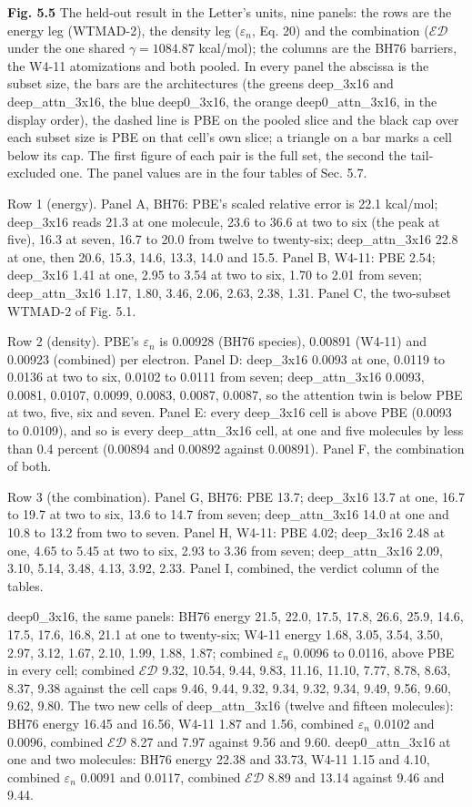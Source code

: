 \documentclass[10pt,a4paper]{article}
\begin{document}
\textbf{Fig. 5.5} The held-out result in the Letter's units, nine panels: the rows are the energy leg (WTMAD-2), the density leg ($\varepsilon_n$, Eq. 20) and the combination ($\mathcal{ED}$ under the one shared $\gamma = 1084.87$ kcal/mol); the columns are the BH76 barriers, the W4-11 atomizations and both pooled. In every panel the abscissa is the subset size, the bars are the architectures (the greens deep\_3x16 and deep\_attn\_3x16, the blue deep0\_3x16, the orange deep0\_attn\_3x16, in the display order), the dashed line is PBE on the pooled slice and the black cap over each subset size is PBE on that cell's own slice; a triangle on a bar marks a cell below its cap. The first figure of each pair is the full set, the second the tail-excluded one. The panel values are in the four tables of Sec. 5.7.

Row 1 (energy). Panel A, BH76: PBE's scaled relative error is 22.1 kcal/mol; deep\_3x16 reads 21.3 at one molecule, 23.6 to 36.6 at two to six (the peak at five), 16.3 at seven, 16.7 to 20.0 from twelve to twenty-six; deep\_attn\_3x16 22.8 at one, then 20.6, 15.3, 14.6, 13.3, 14.0 and 15.5. Panel B, W4-11: PBE 2.54; deep\_3x16 1.41 at one, 2.95 to 3.54 at two to six, 1.70 to 2.01 from seven; deep\_attn\_3x16 1.17, 1.80, 3.46, 2.06, 2.63, 2.38, 1.31. Panel C, the two-subset WTMAD-2 of Fig. 5.1.

Row 2 (density). PBE's $\varepsilon_n$ is 0.00928 (BH76 species), 0.00891 (W4-11) and 0.00923 (combined) per electron. Panel D: deep\_3x16 0.0093 at one, 0.0119 to 0.0136 at two to six, 0.0102 to 0.0111 from seven; deep\_attn\_3x16 0.0093, 0.0081, 0.0107, 0.0099, 0.0083, 0.0087, 0.0087, so the attention twin is below PBE at two, five, six and seven. Panel E: every deep\_3x16 cell is above PBE (0.0093 to 0.0109), and so is every deep\_attn\_3x16 cell, at one and five molecules by less than 0.4 percent (0.00894 and 0.00892 against 0.00891). Panel F, the combination of both.

Row 3 (the combination). Panel G, BH76: PBE 13.7; deep\_3x16 13.7 at one, 16.7 to 19.7 at two to six, 13.6 to 14.7 from seven; deep\_attn\_3x16 14.0 at one and 10.8 to 13.2 from two to seven. Panel H, W4-11: PBE 4.02; deep\_3x16 2.48 at one, 4.65 to 5.45 at two to six, 2.93 to 3.36 from seven; deep\_attn\_3x16 2.09, 3.10, 5.14, 3.48, 4.13, 3.92, 2.33. Panel I, combined, the verdict column of the tables.

deep0\_3x16, the same panels: BH76 energy 21.5, 22.0, 17.5, 17.8, 26.6, 25.9, 14.6, 17.5, 17.6, 16.8, 21.1 at one to twenty-six; W4-11 energy 1.68, 3.05, 3.54, 3.50, 2.97, 3.12, 1.67, 2.10, 1.99, 1.88, 1.87; combined $\varepsilon_n$ 0.0096 to 0.0116, above PBE in every cell; combined $\mathcal{ED}$ 9.32, 10.54, 9.44, 9.83, 11.16, 11.10, 7.77, 8.78, 8.63, 8.37, 9.38 against the cell caps 9.46, 9.44, 9.32, 9.34, 9.32, 9.34, 9.49, 9.56, 9.60, 9.62, 9.80. The two new cells of deep\_attn\_3x16 (twelve and fifteen molecules): BH76 energy 16.45 and 16.56, W4-11 1.87 and 1.56, combined $\varepsilon_n$ 0.0102 and 0.0096, combined $\mathcal{ED}$ 8.27 and 7.97 against 9.56 and 9.60. deep0\_attn\_3x16 at one and two molecules: BH76 energy 22.38 and 33.73, W4-11 1.15 and 4.10, combined $\varepsilon_n$ 0.0091 and 0.0117, combined $\mathcal{ED}$ 8.89 and 13.14 against 9.46 and 9.44.
\end{document}

